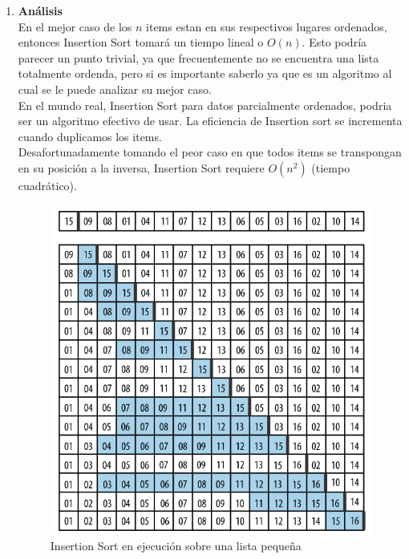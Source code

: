 \documentclass{article}
\begin{document}
                    \begin{enumerate}
                        \item \textbf{An\'{a}lisis}\\
                            En el mejor caso de los $n$ items estan en sus respectivos lugares ordenados, entonces Insertion Sort tomará un tiempo lineal o $O(n)$. Esto podría parecer un punto trivial, ya que frecuentemente no se encuentra una lista totalmente ordenda, pero si es importante saberlo ya que es un algoritmo al cual se le puede analizar su mejor caso.
                            \\
                            En el mundo real, Insertion Sort para datos parcialmente ordenados, podria ser un algoritmo efectivo de usar. La eficiencia de Insertion sort se incrementa cuando duplicamos los items.
                            \\
                            Desafortunadamente tomando el peor caso en que todos items se transpongan en su posición a la inversa, Insertion Sort requiere $O(n^2)$ (tiempo cuadrático).
                            
                            \begin{figure}[H]
                				\centering
                				\includegraphics[scale=0.40]{img/insertion_sort_image1.PNG}
                				\caption{Insertion Sort en ejecución sobre una lista pequeña \cite{Heineman2008}}
                				\label{fig:insertion_sort_img1}
                			\end{figure}
                            

\end{enumerate}
\end{document}
